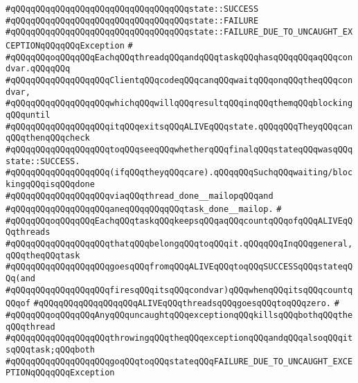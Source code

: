 \verb|#qQQqqQQqqQQqqQQqqQQqqQQqqQQqqQQqqQQqstate::SUCCESS|\newline
\verb|#qQQqqQQqqQQqqQQqqQQqqQQqqQQqqQQqqQQqstate::FAILURE|\newline
\verb|#qQQqqQQqqQQqqQQqqQQqqQQqqQQqqQQqqQQqstate::FAILURE_DUE_TO_UNCAUGHT_EXCEPTIONqQQqqQQqException|\newline
\verb|#|\newline
\verb|#qQQqqQQqoqQQqqQQqEachqQQqthreadqQQqandqQQqtaskqQQqhasqQQqqQQqaqQQqcondvar.qQQqqQQq|\newline
\verb|#qQQqqQQqqQQqqQQqqQQqClientqQQqcodeqQQqcanqQQqwaitqQQqonqQQqtheqQQqcondvar,|\newline
\verb|#qQQqqQQqqQQqqQQqqQQqwhichqQQqwillqQQqresultqQQqinqQQqthemqQQqblockingqQQquntil|\newline
\verb|#qQQqqQQqqQQqqQQqqQQqitqQQqexitsqQQqALIVEqQQqstate.qQQqqQQqTheyqQQqcanqQQqthenqQQqcheck|\newline
\verb|#qQQqqQQqqQQqqQQqqQQqtoqQQqseeqQQqwhetherqQQqfinalqQQqstateqQQqwasqQQqstate::SUCCESS.|\newline
\verb|#qQQqqQQqqQQqqQQqqQQq(ifqQQqtheyqQQqcare).qQQqqQQqSuchqQQqwaiting/blockingqQQqisqQQqdone|\newline
\verb|#qQQqqQQqqQQqqQQqqQQqviaqQQqthread_done__mailopqQQqand|\newline
\verb|#qQQqqQQqqQQqqQQqqQQqaneqQQqqQQqqQQqtask_done__mailop.|\newline
\verb|#|\newline
\verb|#qQQqqQQqoqQQqqQQqEachqQQqtaskqQQqkeepsqQQqaqQQqcountqQQqofqQQqALIVEqQQqthreads|\newline
\verb|#qQQqqQQqqQQqqQQqqQQqthatqQQqbelongqQQqtoqQQqit.qQQqqQQqInqQQqgeneral,qQQqtheqQQqtask|\newline
\verb|#qQQqqQQqqQQqqQQqqQQqgoesqQQqfromqQQqALIVEqQQqtoqQQqSUCCESSqQQqstateqQQq(and|\newline
\verb|#qQQqqQQqqQQqqQQqqQQqfiresqQQqitsqQQqcondvar)qQQqwhenqQQqitsqQQqcountqQQqof|\newline
\verb|#qQQqqQQqqQQqqQQqqQQqALIVEqQQqthreadsqQQqgoesqQQqtoqQQqzero.|\newline
\verb|#|\newline
\verb|#qQQqqQQqoqQQqqQQqAnyqQQquncaughtqQQqexceptionqQQqkillsqQQqbothqQQqtheqQQqthread|\newline
\verb|#qQQqqQQqqQQqqQQqqQQqthrowingqQQqtheqQQqexceptionqQQqandqQQqalsoqQQqitsqQQqtask;qQQqboth|\newline
\verb|#qQQqqQQqqQQqqQQqqQQqgoqQQqtoqQQqstateqQQqFAILURE_DUE_TO_UNCAUGHT_EXCEPTIONqQQqqQQqException|\newline
